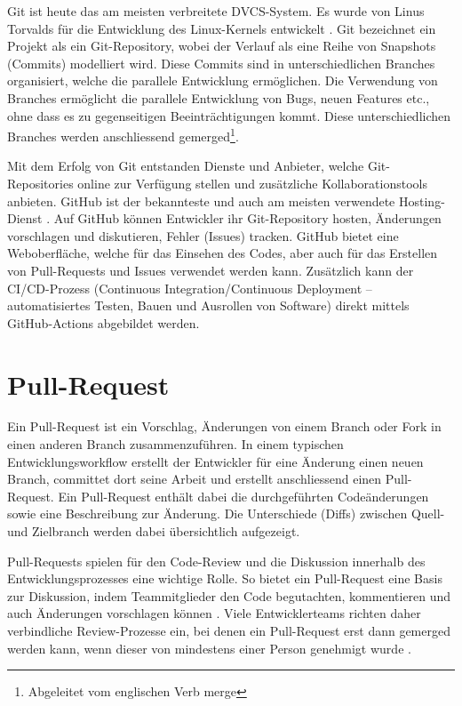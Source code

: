 Git ist heute das am meisten verbreitete DVCS-System. Es wurde von Linus Torvalds für die Entwicklung des Linux-Kernels entwickelt \parencite{zack_git_2018}. Git bezeichnet ein Projekt als ein Git-Repository, wobei der Verlauf als eine Reihe von Snapshots (Commits) modelliert wird. Diese Commits sind in unterschiedlichen Branches organisiert, welche die parallele Entwicklung ermöglichen. Die Verwendung von Branches ermöglicht die parallele Entwicklung von Bugs, neuen Features etc., ohne dass es zu gegenseitigen Beeinträchtigungen kommt. Diese unterschiedlichen Branches werden anschliessend gemerged\footnote{Abgeleitet vom englischen Verb merge}. \parencite{noauthor_informationen_2025}   

Mit dem Erfolg von Git entstanden Dienste und Anbieter, welche Git-Repositories online zur Verfügung stellen und zusätzliche Kollaborationstools anbieten. GitHub ist der bekannteste und auch am meisten verwendete Hosting-Dienst \parencite{noauthor_team_nodate}. Auf GitHub können Entwickler ihr Git-Repository hosten, Änderungen vorschlagen und diskutieren, Fehler (Issues) tracken. GitHub bietet eine Weboberfläche, welche für das Einsehen des Codes, aber auch für das Erstellen von Pull-Requests und Issues verwendet werden kann. Zusätzlich kann der CI/CD-Prozess (Continuous Integration/Continuous Deployment – automatisiertes Testen, Bauen und Ausrollen von Software) direkt mittels GitHub-Actions abgebildet werden. \parencite{noauthor_informationen_2025}  

\section{Pull-Request} 
Ein Pull-Request ist ein Vorschlag, Änderungen von einem Branch oder Fork in einen anderen Branch zusammenzuführen. In einem typischen Entwicklungsworkflow erstellt der Entwickler für eine Änderung einen neuen Branch, committet dort seine Arbeit und erstellt anschliessend einen Pull-Request. Ein Pull-Request enthält dabei die durchgeführten Codeänderungen sowie eine Beschreibung zur Änderung. Die Unterschiede (Diffs) zwischen Quell- und Zielbranch werden dabei übersichtlich aufgezeigt. \parencite{noauthor_about_nodate}

Pull-Requests spielen für den Code-Review und die Diskussion innerhalb des Entwicklungsprozesses eine wichtige Rolle. So bietet ein Pull-Request eine Basis zur Diskussion, indem Teammitglieder den Code begutachten, kommentieren und auch Änderungen vorschlagen können \parencite{atlassian_pull_nodate}. Viele Entwicklerteams richten daher verbindliche Review-Prozesse ein, bei denen ein Pull-Request erst dann gemerged werden kann, wenn dieser von mindestens einer Person genehmigt wurde \parencite{jiang_how_2022}.


